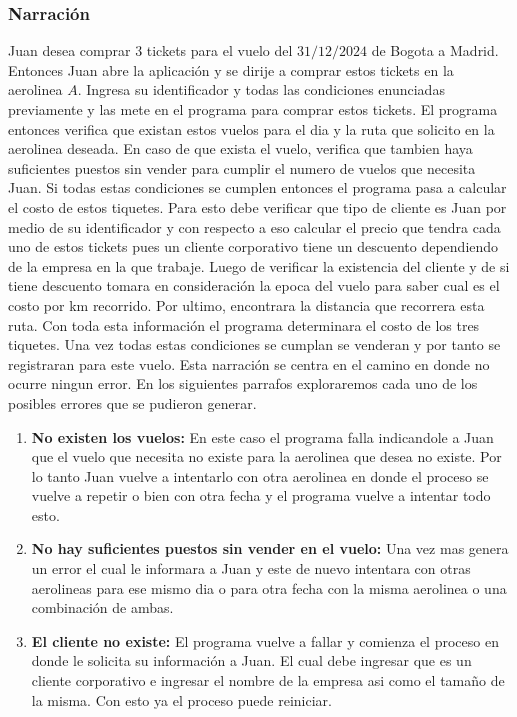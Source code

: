 \documentclass[12pt]{article}
\begin{document}
\subsubsection*{Narración}
  Juan desea comprar $3$ tickets para el vuelo del $31/12/2024$ de Bogota a Madrid. Entonces Juan abre la aplicación y se dirije a comprar estos tickets en la aerolinea $A$. Ingresa su identificador y todas las condiciones enunciadas previamente y las mete en el programa para comprar estos tickets. El programa entonces verifica que existan estos vuelos para el dia y la ruta que solicito en la aerolinea deseada. En caso de que exista el vuelo, verifica que tambien haya suficientes puestos sin vender para cumplir el numero de vuelos que necesita Juan. Si todas estas condiciones se cumplen entonces el programa pasa a calcular el costo de estos tiquetes. Para esto debe verificar que tipo de cliente es Juan por medio de su identificador y con respecto a eso calcular el precio que tendra cada uno de estos tickets pues un cliente corporativo tiene un descuento dependiendo de la empresa en la que trabaje. Luego de verificar la existencia del cliente y de si tiene descuento tomara en consideración la epoca del vuelo para saber cual es el costo por km recorrido. Por ultimo, encontrara la distancia que recorrera esta ruta. Con toda esta información el programa determinara el costo de los tres tiquetes. Una vez todas estas condiciones se cumplan se venderan y por tanto se registraran para este vuelo. Esta narración se centra en el camino en donde no ocurre ningun error. En los siguientes parrafos exploraremos cada uno de los posibles errores que se pudieron generar.

  \begin{enumerate}
    \item \textbf{No existen los vuelos:} En este caso el programa falla indicandole a Juan que el vuelo que necesita no existe para la aerolinea que desea no existe. Por lo tanto Juan vuelve a intentarlo con otra aerolinea en donde el proceso se vuelve a repetir o bien con otra fecha y el programa vuelve a intentar todo esto.
    \item \textbf{No hay suficientes puestos sin vender en el vuelo:} Una vez mas genera un error el cual le informara a Juan y este de nuevo intentara con otras aerolineas para ese mismo dia o para otra fecha con la misma aerolinea o una combinación de ambas.
    \item \textbf{El cliente no existe:} El programa vuelve a fallar y comienza el proceso en donde le solicita su información a Juan. El cual debe ingresar que es un cliente corporativo e ingresar el nombre de la empresa asi como el tamaño de la misma. Con esto ya el proceso puede reiniciar.
  \end{enumerate}

\end{document}
